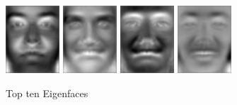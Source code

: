 \begin{figure}[hbt]
  \includegraphics[width=0.18\textwidth]{../results/H_rez/eigenfaces/largest7.jpg}
  \includegraphics[width=0.18\textwidth]{../results/H_rez/eigenfaces/largest8.jpg}
  \includegraphics[width=0.18\textwidth]{../results/H_rez/eigenfaces/largest9.jpg}
  \includegraphics[width=0.18\textwidth]{../results/H_rez/eigenfaces/largest10.jpg}
  \caption{Top ten Eigenfaces}
  \label{fig:top_efaces}
\end{figure}

~\vfill

